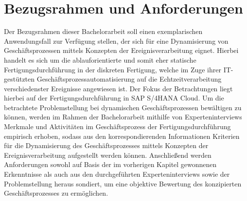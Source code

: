\chapter{Bezugsrahmen und Anforderungen}\label{ch:Bezugsrahmen}
Der Bezugsrahmen dieser Bachelorarbeit soll einen exemplarischen Anwendungsfall zur Verfügung stellen, der sich für eine Dynamisierung von Geschäftsprozessen mittels Konzepten der Ereignisverarbeitung eignet. Hierbei handelt es sich um die ablauforientierte und somit eher statische Fertigungsdurchführung in der diskreten Fertigung, welche im Zuge ihrer \ac{IT}-gestützten Geschäftsprozessautomatisierung auf die Echtzeitverarbeitung verschiedenster Ereignisse angewiesen ist. Der Fokus der Betrachtungen liegt hierbei auf der Fertigungsdurchführung in SAP S/4HANA Cloud.
Um die betrachtete Problemstellung bei dynamischen Geschäftsprozessen bewältigen zu können, werden im Rahmen der Bachelorarbeit mithilfe von Experteninterviews Merkmale und Aktivitäten im Geschäftsprozess der Fertigungsdurchführung empirisch erhoben, sodass aus den korrespondierenden Informationen Kriterien für die Dynamisierung des Geschäftsprozesses mittels Konzepten der Ereignisverarbeitung aufgestellt werden können.
Anschließend werden Anforderungen sowohl auf Basis der im vorherigen Kapitel gewonnenen Erkenntnisse als auch aus den durchgeführten Experteninterviews sowie der Problemstellung heraus sondiert, um eine objektive Bewertung des konzipierten Geschäftsprozesses zu ermöglichen.




